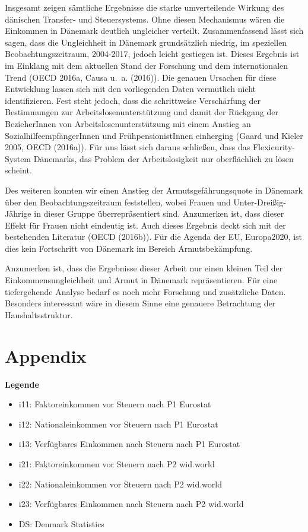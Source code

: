 \documentclass[ngerman,]{article}
\providecommand{\tightlist}{%
  \setlength{\itemsep}{0pt}\setlength{\parskip}{0pt}}
\begin{document}
Insgesamt zeigen sämtliche Ergebnisse die starke umverteilende Wirkung
des dänischen Transfer- und Steuersystems. Ohne diesen Mechanismus wären
die Einkommen in Dänemark deutlich ungleicher verteilt. Zusammenfassend
lässt sich sagen, dass die Ungleichheit in Dänemark grundsätzlich
niedrig, im speziellen Beobachtungszeitraum, 2004-2017, jedoch leicht
gestiegen ist. Dieses Ergebnis ist im Einklang mit dem aktuellen Stand
der Forschung und dem internationalen Trend (OECD 2016a, Causa u.~a.
(2016)). Die genauen Ursachen für diese Entwicklung lassen sich mit den
vorliegenden Daten vermutlich nicht identifizieren. Fest steht jedoch,
dass die schrittweise Verschärfung der Bestimmungen zur
Arbeitslosenunterstützung und damit der Rückgang der BezieherInnen von
Arbeitslosenunterstützung mit einem Anstieg an SozialhilfeempfängerInnen
und FrühpensionistInnen einherging (Gaard und Kieler 2005, OECD
(2016a)). Für uns lässt sich daraus schließen, dass das
Flexicurity-System Dänemarks, das Problem der Arbeitslosigkeit nur
oberflächlich zu lösen scheint.

Des weiteren konnten wir einen Anstieg der Armutsgefährungsquote in
Dänemark über den Beobachtungszeitraum feststellen, wobei Frauen und
Unter-Dreißig-Jährige in dieser Gruppe überrepräsentiert sind.
Anzumerken ist, dass dieser Effekt für Frauen nicht eindeutig ist. Auch
dieses Ergebnis deckt sich mit der bestehenden Literatur (OECD (2016b)).
Für die Agenda der EU, Europa2020, ist dies kein Fortschritt von
Dänemark im Bereich Armutsbekämpfung.

Anzumerken ist, dass die Ergebnisse dieser Arbeit nur einen kleinen Teil
der Einkommensungleichheit und Armut in Dänemark repräsentieren. Für
eine tiefergehende Analyse bedarf es noch mehr Forschung und zusätzliche
Daten. Besonders interessant wäre in diesem Sinne eine genauere
Betrachtung der Haushaltsstruktur.

\newpage

\section{Appendix}\label{appendix}

\textbf{Legende}

\begin{itemize}
\tightlist
\item
  i11: Faktoreinkommen vor Steuern nach P1 Eurostat
\item
  i12: Nationaleinkommen vor Steuern nach P1 Eurostat
\item
  i13: Verfügbares Einkommen nach Steuern nach P1 Eurostat
\item
  i21: Faktoreinkommen vor Steuern nach P2 wid.world
\item
  i22: Nationaleinkommen vor Steuern nach P2 wid.world
\item
  i23: Verfügbares Einkommen nach Steuern nach P2 wid.world
\item
  DS: Denmark Statistics
\end{itemize}
\end{document}
